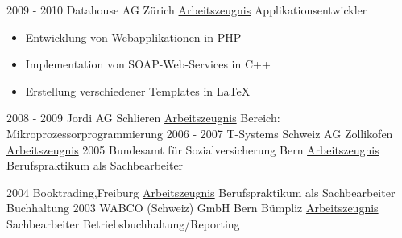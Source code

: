 \documentclass[a4paper]{twentysecondcv} %
\begin{document}
\begin{twenty}
        \twentyitem
        {2009 - 2010}
        {}
        {Datahouse AG \textnormal{Zürich}}
        {\hyperlink{datahouse}{\textcolor{pblue}{Arbeitszeugnis}}}
        {Applikationsentwickler}
        {
        \begin{itemize}
            \item Entwicklung von Webapplikationen in PHP
            \item Implementation von SOAP-Web-Services in C++
            \item Erstellung verschiedener Templates in \LaTeX
        \end{itemize}
        }
        \hypertarget{job_first_back}{}
        \twentyitem
        {}
        {}
        {}
        {}
        {}
        {}
        \twentyitem
        {2008 - 2009}
        {}
        {Jordi AG \textnormal{Schlieren}}
        {\hyperlink{jordi}{\textcolor{pblue}{Arbeitszeugnis}}}
        {Bereich: Mikroprozessorprogrammierung}
        {}
        \twentyitem
        {2006 - 2007}
        {}
        {T-Systems Schweiz AG \textnormal{Zollikofen}}
        {\hyperlink{tsystems}{\textcolor{pblue}{Arbeitszeugnis}}}
        {}
        {}
        \twentyitem
        {2005}
        {}
        {Bundesamt für Sozialversicherung \textnormal{Bern}}
        {\hyperlink{bsv}{\textcolor{pblue}{Arbeitszeugnis}}}
        {Berufspraktikum als Sachbearbeiter}
        {}

        \twentyitem
        {2004}
        {}
        {Booktrading,\textnormal{Freiburg}}
        {\hyperlink{booktrading}{\textcolor{pblue}{Arbeitszeugnis}}}
        {Berufspraktikum als Sachbearbeiter Buchhaltung}
        {}
        \twentyitem
        {2003}
        {}
        {WABCO (Schweiz) GmbH \textnormal{Bern Bümpliz}}
        {\hyperlink{wabco}{\textcolor{pblue}{Arbeitszeugnis}}}
        {Sachbearbeiter Betriebsbuchhaltung/Reporting}
        {}
    \end{twenty}
    \hypertarget{cert_back}{}
\end{document}
